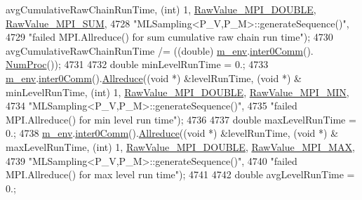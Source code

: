 \begin{DoxyCode}
{{{{      avgCumulativeRawChainRunTime, (\textcolor{keywordtype}{int}) 1, \hyperlink{_mpi_comm_8h_ad0f503bd9fecfe4e570ca3d15aaf2518}{RawValue\_MPI\_DOUBLE}, 
      \hyperlink{_mpi_comm_8h_afbf78d291c032aa7f512bc566cee2bd1}{RawValue\_MPI\_SUM},
4728                                    \textcolor{stringliteral}{"MLSampling<P\_V,P\_M>::generateSequence()"},
4729                                    \textcolor{stringliteral}{"failed MPI.Allreduce() for sum cumulative raw chain run time"});
4730       avgCumulativeRawChainRunTime /= ((double) \hyperlink{class_q_u_e_s_o_1_1_m_l_sampling_a13f1ca4fe9f94822fe572a743eaced1d}{m\_env}.\hyperlink{class_q_u_e_s_o_1_1_base_environment_a689e4d140c74d495d97eb498714a4b82}{inter0Comm}().
      \hyperlink{class_q_u_e_s_o_1_1_mpi_comm_aa780721ae0fdeabc5a15e04cb0cad964}{NumProc}());
4731 
4732       \textcolor{keywordtype}{double} minLevelRunTime = 0.;
4733       \hyperlink{class_q_u_e_s_o_1_1_m_l_sampling_a13f1ca4fe9f94822fe572a743eaced1d}{m\_env}.\hyperlink{class_q_u_e_s_o_1_1_base_environment_a689e4d140c74d495d97eb498714a4b82}{inter0Comm}().\hyperlink{class_q_u_e_s_o_1_1_mpi_comm_a72e137e60ef8060efb1ee5fc874fa4b8}{Allreduce}((\textcolor{keywordtype}{void} *) &levelRunTime, (\textcolor{keywordtype}{void} *) &
      minLevelRunTime, (\textcolor{keywordtype}{int}) 1, \hyperlink{_mpi_comm_8h_ad0f503bd9fecfe4e570ca3d15aaf2518}{RawValue\_MPI\_DOUBLE}, \hyperlink{_mpi_comm_8h_a8e30f42fdac116861205e83e2aa18042}{RawValue\_MPI\_MIN},
4734                                    \textcolor{stringliteral}{"MLSampling<P\_V,P\_M>::generateSequence()"},
4735                                    \textcolor{stringliteral}{"failed MPI.Allreduce() for min level run time"});
4736 
4737       \textcolor{keywordtype}{double} maxLevelRunTime = 0.;
4738       \hyperlink{class_q_u_e_s_o_1_1_m_l_sampling_a13f1ca4fe9f94822fe572a743eaced1d}{m\_env}.\hyperlink{class_q_u_e_s_o_1_1_base_environment_a689e4d140c74d495d97eb498714a4b82}{inter0Comm}().\hyperlink{class_q_u_e_s_o_1_1_mpi_comm_a72e137e60ef8060efb1ee5fc874fa4b8}{Allreduce}((\textcolor{keywordtype}{void} *) &levelRunTime, (\textcolor{keywordtype}{void} *) &
      maxLevelRunTime, (\textcolor{keywordtype}{int}) 1, \hyperlink{_mpi_comm_8h_ad0f503bd9fecfe4e570ca3d15aaf2518}{RawValue\_MPI\_DOUBLE}, \hyperlink{_mpi_comm_8h_a68f3ac7ff71a6504e236b0c95de78178}{RawValue\_MPI\_MAX},
4739                                    \textcolor{stringliteral}{"MLSampling<P\_V,P\_M>::generateSequence()"},
4740                                    \textcolor{stringliteral}{"failed MPI.Allreduce() for max level run time"});
4741 
4742       \textcolor{keywordtype}{double} avgLevelRunTime = 0.;
}}}}
\end{DoxyCode}
